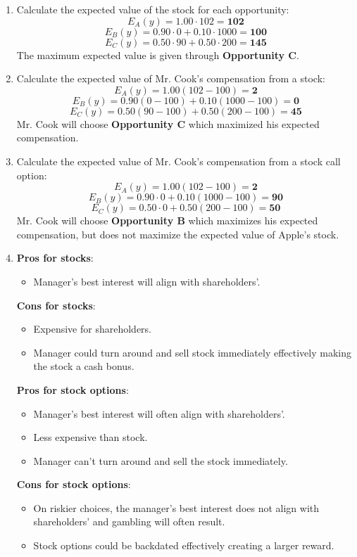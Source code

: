 \documentclass{article}
\begin{document}
\begin{enumerate}

    \item Calculate the expected value of the stock for each opportunity:
        \[E_{A}(y)=1.00\cdot102=\mathbf{102}\]
        \[E_{B}(y)=0.90\cdot0+0.10\cdot1000=\mathbf{100}\]
        \[E_{C}(y)=0.50\cdot90+0.50\cdot200=\mathbf{145}\]
        The maximum expected value is given through \textbf{Opportunity C}.
        
    \item Calculate the expected value of Mr. Cook's compensation from a stock:
        \[E_{A}(y)=1.00(102-100)=\mathbf{2}\]
        \[E_{B}(y)=0.90(0-100)+0.10(1000-100)=\mathbf{0}\]
        \[E_{C}(y)=0.50(90-100)+0.50(200-100)=\mathbf{45}\]
        Mr. Cook will choose \textbf{Opportunity C} which maximized his expected
        compensation.
        
    \item Calculate the expected value of Mr. Cook's compensation from a stock
        call option:
        \[E_{A}(y)=1.00(102-100)=\mathbf{2}\]
        \[E_{B}(y)=0.90\cdot0+0.10(1000-100)=\mathbf{90}\]
        \[E_{C}(y)=0.50\cdot0+0.50(200-100)=\mathbf{50}\]
        Mr. Cook will choose \textbf{Opportunity B} which maximizes his expected
        compensation, but does not maximize the expected value of Apple's stock.
        
    \item \textbf{Pros for stocks}:
        \begin{itemize}
            \item Manager's best interest will align with shareholders'.
        \end{itemize}
        \textbf{Cons for stocks}:
        \begin{itemize}
            \item Expensive for shareholders.
            \item Manager could turn around and sell stock immediately
                effectively making the stock a cash bonus.
        \end{itemize}
        \textbf{Pros for stock options}:
        \begin{itemize}
            \item Manager's best interest will often align with shareholders'.
            \item Less expensive than stock. 
            \item Manager can't turn around and sell the stock immediately.
        \end{itemize}
        \textbf{Cons for stock options}:
        \begin{itemize}
            \item On riskier choices, the manager's best interest does not align
                with shareholders' and gambling will often result.
            \item Stock options could be backdated effectively creating a larger
                reward.
        \end{itemize}
    
\end{enumerate}
\end{document}
